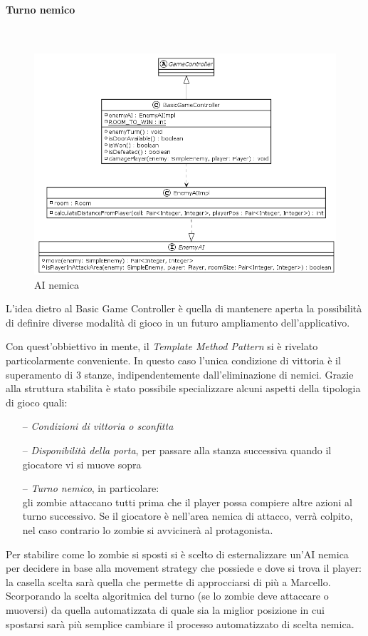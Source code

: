 \documentclass[a4paper,titlepage,12pt]{article}
\begin{document}
\paragraph{Turno nemico}
\par \noindent \\
\begin{figure}[H]
    \centering
    \includegraphics[scale=0.5]{img/uml/EnemyAI.png}
    \caption{AI nemica}
    \label{fig: AI nemica}
\end{figure}
\par \noindent L'idea dietro al Basic Game Controller è quella di mantenere aperta la possibilità di definire diverse modalità di gioco in un futuro ampliamento dell'applicativo.
\par \noindent Con quest'obbiettivo in mente, il \textit{Template Method Pattern} si è rivelato particolarmente conveniente. In questo caso l'unica condizione di vittoria è il superamento di 3 stanze, indipendentemente dall'eliminazione di nemici.
Grazie alla struttura stabilita è stato possibile specializzare alcuni aspetti della tipologia di gioco quali:
\begin{itemize}
    \item[--] \textit{Condizioni di vittoria o sconfitta}
    \item[--] \textit{Disponibilità della porta}, per passare alla stanza successiva quando il giocatore vi si muove sopra
    \item[--] \textit{Turno nemico}, in particolare:\\
		gli zombie attaccano tutti prima che il player possa compiere altre azioni al turno successivo. Se il giocatore è nell'area nemica di attacco, verrà colpito, nel caso contrario lo zombie si avvicinerà al protagonista.
\end{itemize}
\par \noindent Per stabilire come lo zombie si sposti si è scelto di esternalizzare un'AI nemica per decidere in base alla movement strategy che possiede e dove si trova il player: la casella scelta sarà quella che permette di approcciarsi di più a Marcello. Scorporando la scelta algoritmica del turno (se lo zombie deve attaccare o muoversi) da quella automatizzata di quale sia la miglior posizione in cui spostarsi sarà più semplice cambiare il processo automatizzato di scelta nemica.
\end{document}
